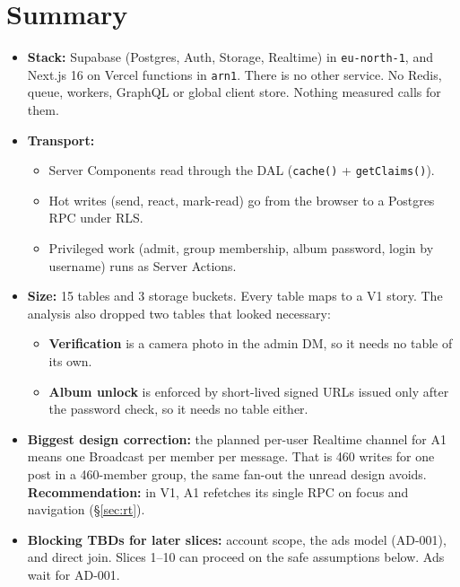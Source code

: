 \documentclass[11pt,a4paper]{article}
\newcommand{\code}[1]{\texttt{\small #1}}
\begin{document}
\section{Summary}
\begin{itemize}
  \item \textbf{Stack:} Supabase (Postgres, Auth, Storage, Realtime) in \code{eu-north-1}, and Next.js 16 on
        Vercel functions in \code{arn1}. There is no other service. No Redis, queue, workers, GraphQL or global
        client store. Nothing measured calls for them.
  \item \textbf{Transport:}
        \begin{itemize}
          \item Server Components read through the DAL (\code{cache()} + \code{getClaims()}).
          \item Hot writes (send, react, mark-read) go from the browser to a Postgres RPC under RLS.
          \item Privileged work (admit, group membership, album password, login by username) runs as Server Actions.
        \end{itemize}
  \item \textbf{Size:} 15 tables and 3 storage buckets. Every table maps to a V1 story. The analysis also dropped
        two tables that looked necessary:
        \begin{itemize}
          \item \textbf{Verification} is a camera photo in the admin DM, so it needs no table of its own.
          \item \textbf{Album unlock} is enforced by short-lived signed URLs issued only after the password check,
                so it needs no table either.
        \end{itemize}
  \item \textbf{Biggest design correction:} the planned per-user Realtime channel for A1 means one Broadcast per
        member per message. That is 460 writes for one post in a 460-member group, the same fan-out the unread
        design avoids. \textbf{Recommendation:} in V1, A1 refetches its single RPC on focus and navigation (\S\ref{sec:rt}).
  \item \textbf{Blocking TBDs for later slices:} account scope, the ads model (AD-001), and direct join.
        Slices 1--10 can proceed on the safe assumptions below. Ads wait for AD-001.
\end{itemize}
\end{document}
